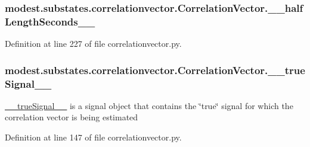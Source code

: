\subsubsection[{\texorpdfstring{\+\_\+\+\_\+half\+Length\+Seconds\+\_\+\+\_\+}{__halfLengthSeconds__}}]{\setlength{\rightskip}{0pt plus 5cm}modest.\+substates.\+correlationvector.\+Correlation\+Vector.\+\_\+\+\_\+half\+Length\+Seconds\+\_\+\+\_\+\hspace{0.3cm}{\ttfamily [private]}}\hypertarget{classmodest_1_1substates_1_1correlationvector_1_1CorrelationVector_a14a4e8c90f37c9c9d5392e03a61ff7a6}{}\label{classmodest_1_1substates_1_1correlationvector_1_1CorrelationVector_a14a4e8c90f37c9c9d5392e03a61ff7a6}


Definition at line 227 of file correlationvector.\+py.

\subsubsection[{\texorpdfstring{\+\_\+\+\_\+true\+Signal\+\_\+\+\_\+}{__trueSignal__}}]{\setlength{\rightskip}{0pt plus 5cm}modest.\+substates.\+correlationvector.\+Correlation\+Vector.\+\_\+\+\_\+true\+Signal\+\_\+\+\_\+\hspace{0.3cm}{\ttfamily [private]}}\hypertarget{classmodest_1_1substates_1_1correlationvector_1_1CorrelationVector_af2f52cea1c695f36dd100f529c322e94}{}\label{classmodest_1_1substates_1_1correlationvector_1_1CorrelationVector_af2f52cea1c695f36dd100f529c322e94}


\hyperlink{classmodest_1_1substates_1_1correlationvector_1_1CorrelationVector_af2f52cea1c695f36dd100f529c322e94}{\+\_\+\+\_\+true\+Signal\+\_\+\+\_\+} is a signal object that contains the \char`\"{}true\char`\"{} signal for which the correlation vector is being estimated 



Definition at line 147 of file correlationvector.\+py.


